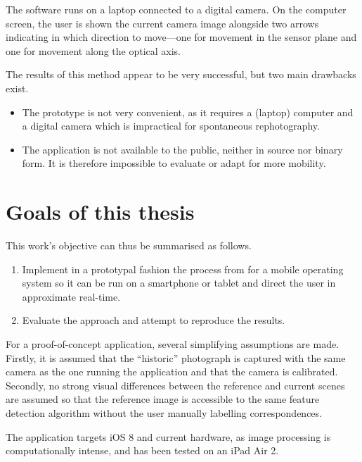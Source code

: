 The software runs on a laptop connected to a digital camera. On the computer
screen, the user is shown the current camera image alongside two arrows
indicating in which direction to move---one for movement in the sensor plane and
one for movement along the optical axis.

The results of this method appear to be very successful, but two main drawbacks
exist.

\begin{itemize}
   \item The prototype is not very convenient, as it requires a (laptop)
      computer and a digital camera which is impractical for
      spontaneous rephotography.
   \item The application is not available to the public, neither in source nor
      binary form. It is therefore impossible to evaluate or adapt for more mobility.
\end{itemize}

\section{Goals of this thesis}

This work's objective can thus be summarised as follows.
\begin{enumerate}
   \item Implement in a prototypal fashion the process from \citep{bae2010} for
      a mobile operating system so it can be run on a smartphone or tablet and
      direct the user in approximate real-time.
   \item Evaluate the approach and attempt to reproduce the results.
\end{enumerate}

For a proof-of-concept application, several simplifying assumptions are made.
Firstly, it is assumed that the ``historic'' photograph is captured with the
same camera as the one running the application and that the camera is calibrated.
Secondly, no strong visual differences between the reference and current scenes
are assumed so that the reference image is accessible to the same feature
detection algorithm without the user manually labelling correspondences. 

The application targets iOS 8 and current hardware, as image processing is
computationally intense, and has been tested on an iPad Air 2.
